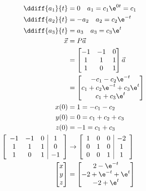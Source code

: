 \documentclass{math}
\begin{document}
\begin{align*}
  \ddiff{a_1}{t} &= 0 \quad a_1 = c_1\e^{0t} = c_1 \\
  \ddiff{a_2}{t} &= -a_2 \quad a_2 = c_2\e^{-t} \\
  \ddiff{a_3}{t} &= a_3 \quad a_3 = c_3\e^{t} \\
  \vec{x} &= P\vec{a} \\
  &= \begin{bmatrix}
    -1 & -1 & 0 \\
    1 & 1 & 1 \\
    1 & 0 & 1
  \end{bmatrix}\vec{a} \\
  &= \begin{bmatrix}
    -c_1-c_2\e^{-t} \\
    c_1+c_2\e^{-t}+c_3\e^{t} \\
    c_1+c_3\e^{t}
  \end{bmatrix} \\
  x(0) &= 1 = -c_1-c_2 \\
  y(0) &= 0 = c_1+c_2+c_3 \\
  z(0) &= -1 = c_1+c_3 \\
  \left[\begin{array}{ccc|c}
    -1 & -1 & 0 & 1 \\
    1 & 1 & 1 & 0 \\
    1 & 0 & 1 & -1
  \end{array}\right] &\to \left[\begin{array}{ccc|c}
    1 & 0 & 0 & -2 \\
    0 & 1 & 0 & 1 \\
    0 & 0 & 1 & 1
  \end{array}\right] \\
  \begin{bmatrix}x \\ y \\ z\end{bmatrix} &= \begin{bmatrix}
    2-\e^{-t} \\
    -2+\e^{-t}+\e^{t} \\
    -2+\e^{t}
  \end{bmatrix}
\end{align*}
\end{document}

